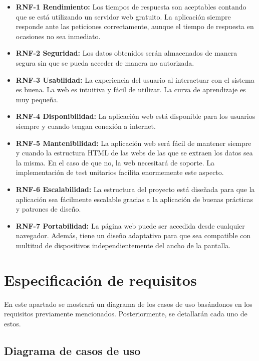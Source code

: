 \begin{itemize}
\item\textbf{RNF-1 Rendimiento:} Los tiempos de respuesta son aceptables contando que se está utilizando un servidor web gratuito. La aplicación siempre responde ante las peticiones correctamente, aunque el tiempo de respuesta en ocasiones no sea inmediato.
\item\textbf{RNF-2 Seguridad:} Los
datos obtenidos serán almacenados de manera segura sin que se pueda acceder de manera no autorizada. 
\item\textbf{RNF-3 Usabilidad:} La experiencia del usuario al interactuar con el sistema es buena. La web es intuitiva y fácil de utilizar. La curva de aprendizaje es muy pequeña. 
\item\textbf{RNF-4 Disponibilidad:} La aplicación web está disponible para los usuarios siempre y cuando tengan conexión a internet.
\item\textbf{RNF-5 Mantenibilidad:} La aplicación web será fácil de mantener siempre y cuando la estructura HTML de las webs de las que se extraen los datos sea la misma. En el caso de que no, la web necesitará de soporte. La implementación de test unitarios facilita enormemente este aspecto.
\item\textbf{RNF-6 Escalabilidad:} La estructura del proyecto está diseñada para que la aplicación sea fácilmente escalable gracias a la aplicación de buenas prácticas y patrones de diseño.
\item\textbf{RNF-7 Portabilidad:} La página web puede ser accedida desde cualquier navegador. Además, tiene un diseño adaptativo para que sea compatible con multitud de dispositivos independientemente del ancho de la pantalla.

\end{itemize}

\section{Especificación de requisitos}
En este apartado se mostrará un diagrama de los casos de uso basándonos en los requisitos previamente mencionados. Posteriormente, se detallarán cada uno de estos.

\newpage
\begin{landscape}
\subsection{Diagrama de casos de uso}\label{diagrama-de-casos-de-uso}
\vspace{1cm}
\end{landscape}
\newpage

